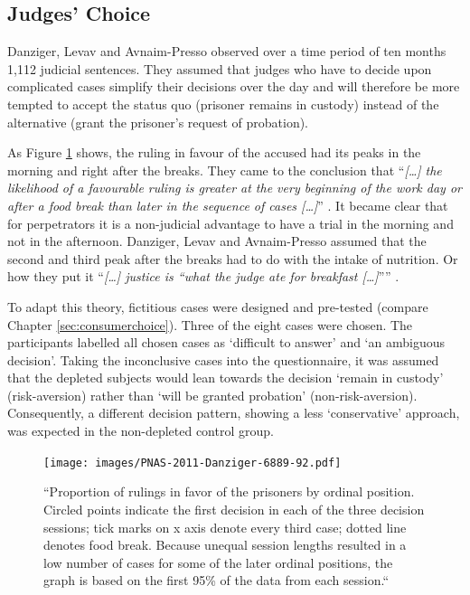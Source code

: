 \subsection{Judges’ Choice}\label{sec:judgeschoice}
Danziger, Levav and Avnaim-Presso \citep{danziger2011extraneous} observed over a time period of ten months 1,112 judicial sentences. They assumed that judges who have to decide upon complicated cases simplify their decisions over the day and will therefore be more tempted to accept the status quo (prisoner remains in custody) instead of the alternative (grant the prisoner’s request of probation).\par
As Figure \ref{fig:decisions_danziger} shows, the ruling in favour of the accused had its peaks in the morning and right after the breaks. They came to the conclusion that “\emph{[\ldots] the likelihood of a favourable ruling is greater at the very beginning of the work day or after a food break than later in the sequence of cases [\ldots]}” \citep[p.~6890]{danziger2011extraneous}. It became clear that for perpetrators it is a non-judicial advantage to have a trial in the morning and not in the afternoon. Danziger, Levav and Avnaim-Presso assumed that the second and third peak after the breaks had to do with the intake of nutrition. Or how they put it “\emph{[\ldots] justice is “what the judge ate for breakfast [\ldots]}”” \citep[p.~6889]{danziger2011extraneous}.\par
To adapt this theory, fictitious cases were designed and pre-tested (compare Chapter \ref{sec:consumerchoice}). Three of the eight cases were chosen. The participants labelled all chosen cases as ‘difficult to answer’ and ‘an ambiguous decision’. Taking the inconclusive cases into the questionnaire, it was assumed that the depleted subjects would lean towards the decision ‘remain in custody’ (risk-aversion) rather than ‘will be granted probation’ (non-risk-aversion). Consequently, a different decision pattern, showing a less ‘conservative’ approach, was expected in the non-depleted control group.\par

\begin{figure}[h!]
\center
	\texttt{[image: images/PNAS-2011-Danziger-6889-92.pdf]}
  \caption{“Proportion of rulings in favor of the prisoners by ordinal position. Circled points indicate the first decision in each of the three decision sessions; tick marks on x axis denote every third case; dotted line denotes food break. Because unequal session lengths resulted in a low number of cases for some of the later ordinal positions, the graph is based on the first 95\% of the data from each session.“ \citep{danziger2011extraneous}}\label{fig:decisions_danziger}
\end{figure}

